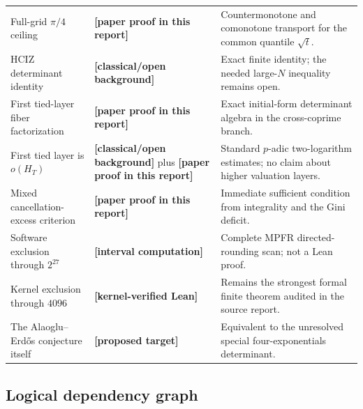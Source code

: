 \documentclass[11pt,oneside]{article}
\theoremstyle{definition}
\theoremstyle{remark}
\newcommand{\statuslean}{\textcolor{leanblue}{\textbf{[kernel-verified Lean]}}}
\newcommand{\statusnew}{\textcolor{newgreen}{\textbf{[paper proof in this report]}}}
\newcommand{\statuscomp}{\textcolor{computeviolet}{\textbf{[interval computation]}}}
\newcommand{\statusknown}{\textcolor{classicalgray}{\textbf{[classical/\allowbreak open background]}}}
\newcommand{\statusopen}{\textcolor{classicalgray}{\textbf{[proposed target]}}}
\begin{document}
\begin{longtable}{@{}>{\raggedright\arraybackslash}p{}>{\raggedright\arraybackslash}p{}>{\raggedright\arraybackslash}p{}@{}}
\addlinespace
Full-grid $\pi/4$ ceiling & \statusnew & Countermonotone and comonotone transport for the common quantile $\sqrt t$. \\
\addlinespace
HCIZ determinant identity & \statusknown & Exact finite identity; the needed large-$N$ inequality remains open. \\
\addlinespace
First tied-layer fiber factorization & \statusnew & Exact initial-form determinant algebra in the cross-coprime branch. \\
\addlinespace
First tied layer is $o(H_T)$ & \statusknown{} plus \statusnew & Standard $p$-adic two-logarithm estimates; no claim about higher valuation layers. \\
\addlinespace
Mixed cancellation-excess criterion & \statusnew & Immediate sufficient condition from integrality and the Gini deficit. \\
\addlinespace
Software exclusion through $2^{27}$ & \statuscomp & Complete MPFR directed-rounding scan; not a Lean proof. \\
\addlinespace
Kernel exclusion through $4096$ & \statuslean & Remains the strongest formal finite theorem audited in the source report. \\
\addlinespace
The Alaoglu--Erd\H{o}s conjecture itself & \statusopen & Equivalent to the unresolved special four-exponentials determinant. \\
\bottomrule
\end{longtable}

\subsection{Logical dependency graph}
\end{document}
